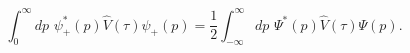 \begin{equation}\label{R+R}
\int_0^\infty dp\,\,\psi_+^*(p)\hat V(\tau)\psi_+(p)=\frac{1}{2}
\int_{-\infty}^\infty dp\,\,\Psi^*(p)\hat V(\tau)\Psi(p).
\end{equation}

